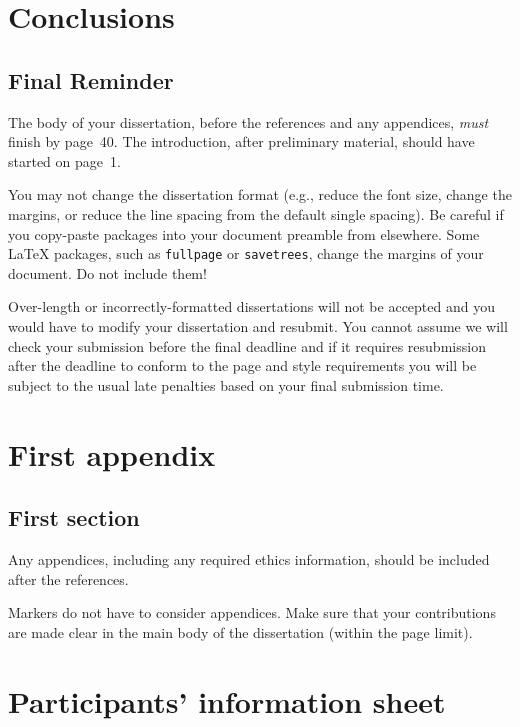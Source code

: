 \documentclass[logo,bsc,singlespacing,parskip]{infthesis}
\theoremstyle{definition}
\theoremstyle{example}
\theoremstyle{theorem}
\theoremstyle{theorem}
\theoremstyle{theorem}
\theoremstyle{definition}
\theoremstyle{definition}
\theoremstyle{definition}
\begin{document}
\chapter{Conclusions}

\section{Final Reminder}

The body of your dissertation, before the references and any appendices,
\emph{must} finish by page~40. The introduction, after preliminary material,
should have started on page~1.

You may not change the dissertation format (e.g., reduce the font size, change
the margins, or reduce the line spacing from the default single spacing). Be
careful if you copy-paste packages into your document preamble from elsewhere.
Some \LaTeX{} packages, such as \texttt{fullpage} or \texttt{savetrees}, change
the margins of your document. Do not include them!

Over-length or incorrectly-formatted dissertations will not be accepted and you
would have to modify your dissertation and resubmit. You cannot assume we will
check your submission before the final deadline and if it requires resubmission
after the deadline to conform to the page and style requirements you will be
subject to the usual late penalties based on your final submission time.

% 




\appendix

\chapter{First appendix}

\section{First section}

Any appendices, including any required ethics information, should be included
after the references.

Markers do not have to consider appendices. Make sure that your contributions
are made clear in the main body of the dissertation (within the page limit).

\chapter{Participants' information sheet}
\end{document}
